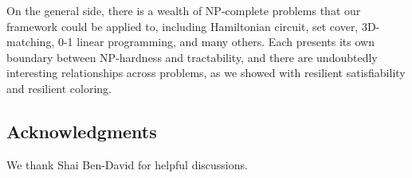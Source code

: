 \documentclass{llncs}
\begin{document}
On the general side, there is a wealth of NP-complete problems that our
framework could be applied to, including Hamiltonian circuit, set cover,
3D-matching, 0-1 linear programming, and many others. Each presents its own
boundary between NP-hardness and tractability, and there are undoubtedly
interesting relationships across problems, as we showed with resilient
satisfiability and resilient coloring.

\subsection*{Acknowledgments}
We thank Shai Ben-David for helpful discussions.




\end{document}
